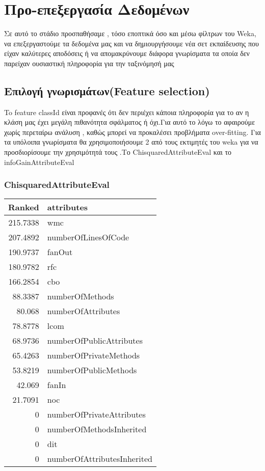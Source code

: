 \chapter{Προ-επεξεργασία Δεδομένων}
Σε αυτό το στάδιο προσπαθήσαμε , τόσο εποπτικά όσο και μέσω φίλτρων του Weka, να επεξεργαστούμε τα δεδομένα μας και να δημιουργήσουμε νέα σετ εκπαίδευσης που είχαν καλύτερες αποδόσεις ή να απομακρύνουμε διάφορα γνωρίσματα τα οποία δεν παρείχαν ουσιαστική πληροφορία για την ταξινόμησή μας
\section {Επιλογή γνωρισμάτων(Feature selection) }
To feature classId είναι προφανές ότι δεν περιέχει κάποια πληροφορία για το αν η κλάση μας έχει μεγάλη πιθανότητα σφάλματος ή όχι.Για αυτό το λόγω το αφαιρούμε χωρίς περεταίρω ανάλυση , καθώς μπορεί να προκαλέσει προβλήματα over-fitting.
Για τα υπόλοιπα γνωρίσματα θα χρησιμοποιήσουμε 2 από τους εκτιμητές  του weka για να προσδιορίσουμε την χρησιμότητά τους .Το ChisquaredAttributeEval και το infoGainAttributeΕval
\subsection{ChisquaredAttributeEval}

\begin{tabular}{r|l}
Ranked& attributes\\
  \hline
215.7338 &  wmc\\
207.4892 &   numberOfLinesOfCode\\
190.9737 &   fanOut\\
180.9782 &  rfc\\
166.2854 &   cbo\\
 88.3387 &  numberOfMethods\\
 80.068  &   numberOfAttributes\\
 78.8778&   lcom\\
 68.9736&   numberOfPublicAttributes\\
 65.4263&   numberOfPrivateMethods\\
 53.8219&   numberOfPublicMethods\\
 42.069  &   fanIn\\
 21.7091&    noc\\
  0      &  numberOfPrivateAttributes\\
  0     &   numberOfMethodsInherited\\
  0    &     dit\\
  0    &     numberOfAttributesInherited\\
 \end{tabular}

